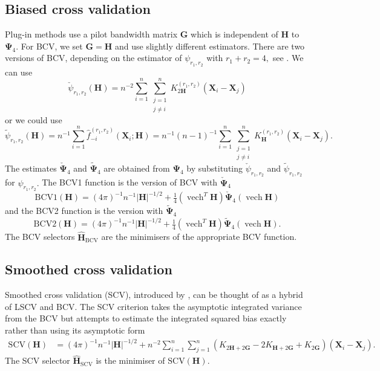 \documentclass[a4paper,11pt]{article}
\renewcommand{\vec}[1]{\boldsymbol{#1}}
\newcommand{\mat}[1]{\mathbf{#1}}
\newcommand{\gmat}[1]{\boldsymbol{#1}}
\def\jneqi{\substack{j=1 \\ j\neq i}}
\def\HH{\mat{H}}
\def\G{\mat{G}}
\def\SCV{\mathrm{SCV}}
\def\BCV{\mathrm{BCV}}
\DeclareMathOperator{\VECH}{vech}
\begin{document}
\subsection{Biased cross validation}
Plug-in methods use a pilot bandwidth matrix $\G$ 
which is independent of $\HH$ to $\gmat{\Psi}_4$.
For BCV, we set $\G = \HH$ and use slightly different estimators.    
There are two versions of BCV, depending on the 
estimator of $\psi_{r_1, r_2}$ with $r_1 + r_2 = 4,$  see \citet*{sain94}. 
We can use
\begin{equation}
\label{eq:leave-out1}
\check{\psi}_{r_1, r_2} (\HH) =
n^{-2} \sum_{i=1}^{n}\sum_{\jneqi}^{n} 
K^{(r_1, r_2)}_{2\HH} (\vec{X}_i - \vec{X}_j)
\end{equation}
or we could use 
\begin{equation}
\label{eq:leave-out2} \tilde{\psi}_{r_1, r_2} (\HH) = n^{-1}
\sum_{i=1}^n \hat{f}_{-i}^{(r_1, r_2)} (\vec{X}_i; \HH) =
n^{-1} (n-1)^{-1} \sum_{i=1}^{n}\sum_{\jneqi}^{n} 
K^{(r_1, r_2)}_{\HH} (\vec{X}_i - \vec{X}_j).
\end{equation}
The estimates $\check{\gmat{\Psi}}_4$ and
$\tilde{\gmat{\Psi}}_4$ are obtained from $\gmat{\Psi}_4$ by substituting
$\check{\psi}_{r_1, r_2}$ and $\tilde{\psi}_{r_1, r_2}$  for $\psi_{r_1, r_2}.$
The BCV1 function is the version of BCV with $\check{\gmat{\Psi}}_4$ 
\begin{equation}
\label{eq:bcv1}
\BCV 1 (\HH) = (4\pi)^{-1}n^{-1} |\HH|^{-1/2} + \tfrac{1}{4} (\VECH^T \HH)
\check{\gmat{\Psi}}_4  (\VECH \HH)
\end{equation}
and the BCV2 function is the version with $\tilde{\gmat{\Psi}}_4$ 
\begin{equation}
\label{eq:bcv2}
\BCV 2 (\HH) =(4\pi)^{-1} n^{-1} |\HH|^{-1/2} + \tfrac{1}{4} (\VECH^T \HH)
\tilde{\gmat{\Psi}}_4  (\VECH \HH).
\end{equation}
The BCV selectors $\hat{\HH}_\BCV$ are the minimisers of the appropriate 
BCV function.

\subsection{Smoothed cross validation}
\label{sec:scv}
Smoothed cross validation (SCV), introduced by \citet*{hall92}, 
can be thought of as a hybrid of LSCV and BCV.  The SCV 
criterion takes the asymptotic integrated variance from the BCV but attempts
to estimate the integrated squared bias exactly rather than using its asymptotic
form
\begin{align}
\label{eq:scv_norm}
\SCV (\HH) &= (4\pi)^{-1} n^{-1} |\HH|^{-1/2} 
+ n^{-2} \sum_{i=1}^n
\sum_{j=1}^n (K_{2\HH + 2\G} - 2K_{\HH + 2\G} + K_{2\G})
(\vec{X}_i - \vec{X}_j). 
\end{align}
The SCV selector $\hat{\HH}_\SCV$ is the minimiser of $ \SCV(\HH).$
\end{document}
